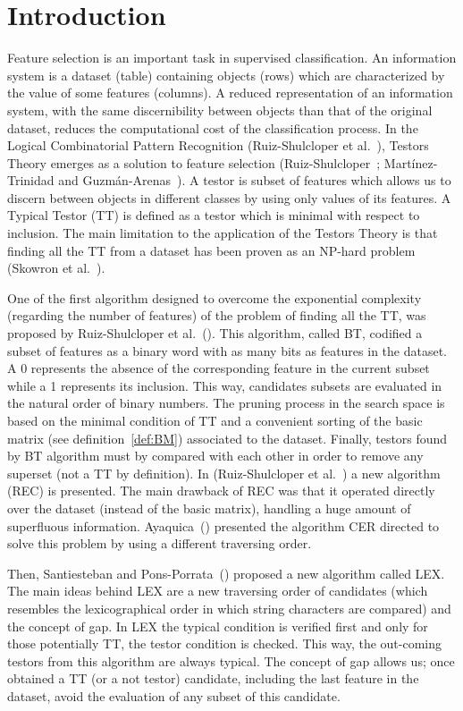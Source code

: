 \documentclass[citeauthoryear]{llncs}
\begin{document}
\section{Introduction}
%
	Feature selection is an important task in supervised classification. An information system is a dataset (table) containing objects (rows) which are	characterized by the value of some features (columns). A reduced representation of an information system, with the same discernibility between objects than that of the original dataset, reduces the computational	cost of the classification process. In the Logical Combinatorial Pattern Recognition (Ruiz-Shulcloper et al.~\cite{Shulcloper1995}), Testors Theory emerges as a solution to feature selection (Ruiz-Shulcloper~\cite{Shulcloper2008};	Mart\'inez-Trinidad and	Guzm\'an-Arenas~\cite{Martinez2001}). A testor is subset of features which allows us to discern between objects in different classes by using only values of its features. A Typical Testor (TT) is defined as a testor which is minimal with respect to inclusion. The main limitation to the application of the Testors Theory is that finding all the TT from a dataset has been proven as an NP-hard problem (Skowron et al.~\cite{Skowron1992}).
	
	One of the first algorithm designed to overcome the exponential complexity (regarding the number of features) of the problem of finding all the TT, was 
	proposed by Ruiz-Shulcloper et al.~(\cite{Shulcloper1985}). This algorithm, called BT, codified a subset of features as a binary word with as many bits as features in the dataset. A 0 represents the absence of the corresponding feature in the current	subset while a 1 represents its inclusion. This way, candidates subsets are evaluated in the natural order of binary numbers. The pruning process in the	search space is based on the minimal condition of TT and a convenient sorting of the basic matrix (see definition~\ref{def:BM}) associated to the dataset. Finally, testors found by BT algorithm must by compared with each other in order to remove	any superset (not a TT by definition). In (Ruiz-Shulcloper et al.~\cite{Shulcloper1995b}) a new algorithm (REC) is presented.	The main drawback of REC was that it operated directly over the dataset (instead of the	basic matrix), handling a huge amount of superfluous information. Ayaquica~(\cite{Ayaquica1997})	presented the algorithm CER directed to solve this problem by using a different traversing	order. 
	
	Then, Santiesteban and Pons-Porrata~(\cite{Santiesteban2003}) proposed a new algorithm called LEX. The main ideas behind LEX are a new traversing order of candidates (which resembles the	lexicographical order in which string characters are compared) and the concept of gap. In LEX the typical condition is verified first and only for those potentially TT, the testor condition is checked. This way, the out-coming testors from this algorithm are always typical. The concept of gap allows us; once obtained a TT (or a not testor) candidate, including the last feature in the dataset, avoid the evaluation of any subset of this candidate.
	
\end{document}
